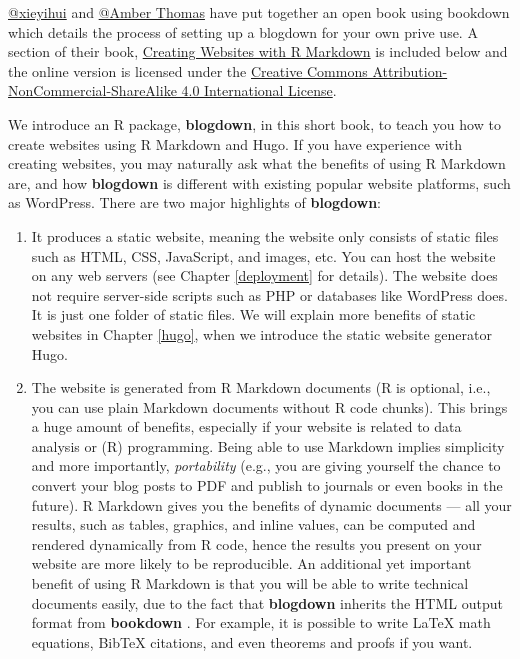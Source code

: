 \documentclass[]{book}
\theoremstyle{definition}
\theoremstyle{definition}
\theoremstyle{remark}
\begin{document}
\href{https://twitter.com/xieyihui}{@xieyihui} and
\href{https://proquestionasker.github.io/}{@Amber Thomas} have put
together an open book using bookdown which details the process of
setting up a blogdown for your own prive use. A section of their book,
\href{https://bookdown.org/yihui/blogdown/}{Creating Websites with R
Markdown} is included below and the online version is licensed under the
\href{http://creativecommons.org/licenses/by-nc-sa/4.0/}{Creative
Commons Attribution-NonCommercial-ShareAlike 4.0 International License}.

We introduce an R package, \textbf{blogdown}, in this short book, to
teach you how to create websites using R Markdown and Hugo. If you have
experience with creating websites, you may naturally ask what the
benefits of using R Markdown are, and how \textbf{blogdown} is different
with existing popular website platforms, such as WordPress. There are
two major highlights of \textbf{blogdown}:

\begin{enumerate}
\def\labelenumi{\arabic{enumi}.}
\item
  It produces a static website, meaning the website only consists of
  static files such as HTML, CSS, JavaScript, and images, etc. You can
  host the website on any web servers (see Chapter \ref{deployment} for
  details). The website does not require server-side scripts such as PHP
  or databases like WordPress does. It is just one folder of static
  files. We will explain more benefits of static websites in Chapter
  \ref{hugo}, when we introduce the static website generator Hugo.
\item
  The website is generated from R Markdown documents (R is optional,
  i.e., you can use plain Markdown documents without R code chunks).
  This brings a huge amount of benefits, especially if your website is
  related to data analysis or (R) programming. Being able to use
  Markdown implies simplicity and more importantly, \emph{portability}
  (e.g., you are giving yourself the chance to convert your blog posts
  to PDF and publish to journals or even books in the future). R
  Markdown gives you the benefits of dynamic documents --- all your
  results, such as tables, graphics, and inline values, can be computed
  and rendered dynamically from R code, hence the results you present on
  your website are more likely to be reproducible. An additional yet
  important benefit of using R Markdown is that you will be able to
  write technical documents easily, due to the fact that
  \textbf{blogdown} inherits the HTML output format from
  \textbf{bookdown} \citep{R-bookdown}. For example, it is possible to
  write LaTeX math equations, BibTeX citations, and even theorems and
  proofs if you want.
\end{enumerate}
\end{document}
